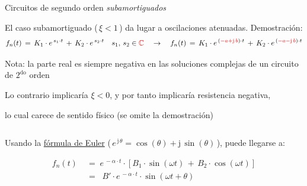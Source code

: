 \documentclass[aspectratio=169, usenames,svgnames,dvipsnames]{beamer}
\begin{document}

\begin{frame}{Circuitos de segundo orden \hspace{2mm}\textit{subamortiguados}}

    \vspace{4mm}
    
    El caso \alert{subamortiguado} ($\, \xi<1 \,$) da lugar a \alert{oscilaciones atenuadas}. \hspace{5mm}Demostración:
    \[
        f_n(t) \,=\, K_1 \cdot e^{\, s_1\cdot t} \,+\, K_2 \cdot e^{\, s_2\cdot t} \quad s_1, \, s_2 \in {\color{red}\mathbb{C}} 
        \quad\rightarrow\quad 
        f_n(t) \,=\, K_1 \cdot e^{\, ({\color{red} - a + \mathrm{j}\, b })\cdot t} \,+\, K_2 \cdot e^{\, ({\color{red} - a - \mathrm{j}\, b })\cdot t}
    \]

    \begin{center}
        \small \alert{Nota}: la \alert{parte real es siempre negativa} en las soluciones complejas de un circuito de $2^{\textrm{do}}$ orden 

        \vspace{-1mm}
        Lo contrario implicaría $\xi<0$, y por tanto implicaría resistencia negativa, 

        \vspace{-1.5mm}
        lo cual carece de sentido físico (se omite la demostración)   
    \end{center}

    \normalsize

    \begin{columns}
    \begin{column}{0.65\columnwidth}
    
        \vspace{1mm}
        
        Usando la \href{https://raw.githubusercontent.com/ETSIDI-IE/tc/master/docs/diapos/TC1_Trigonometria_Complejos_LBB.pdf}{fórmula de Euler} ($\, e^{\,\mathrm{j}\, \theta} = \cos(\theta)+\mathrm{j}\,\sin(\theta) \,$), puede llegarse a:

        \vspace{-4mm}
        
        \begin{align*}
           f_n(t) \;&=\; e^{\,-\alpha\cdot t} \cdot \left[B_1 \cdot \sin(\omega t)  \,+\, B_2 \cdot \cos(\omega t)\right] \\
           &=\; \boxed{\; B' \cdot e^{\,-\alpha\cdot t} \cdot \sin(\omega t + \theta) \;}
        \end{align*}


\end{column}
\end{columns}
\end{frame}
\end{document}
